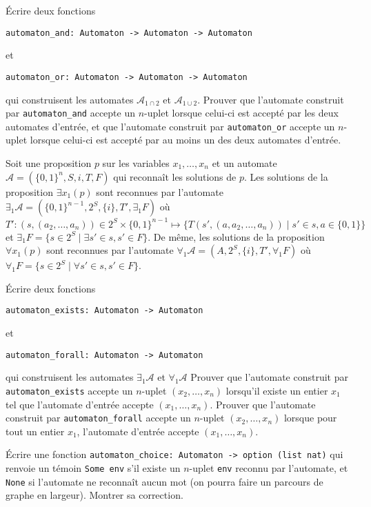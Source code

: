 \documentclass{article}
\begin{document}
Écrire deux fonctions
\begin{verbatim}
automaton_and: Automaton -> Automaton -> Automaton
\end{verbatim}
et
\begin{verbatim}
automaton_or: Automaton -> Automaton -> Automaton
\end{verbatim}
qui construisent les automates \(\mathcal A_{1 \cap 2}\) et \(\mathcal A_{1 \cup 2}\). Prouver que l'automate construit par \texttt{automaton_and} accepte un \(n\)-uplet lorsque celui-ci est accepté par les deux automates d'entrée, et que l'automate construit par \texttt{automaton_or}
accepte un \(n\)-uplet lorsque celui-ci est accepté par au moins un des deux automates d'entrée.

Soit une proposition \(p\) sur les variables \(x_1, \dots, x_n\) et un automate \(\mathcal A = (\{0,1\}^n, S, i, T, F)\) qui reconnaît les solutions de \(p\). Les solutions de la proposition \(\exists x_1 (p)\) sont reconnues par l'automate \(\exists_1 \mathcal A = (\{0,1\}^{n-1}, 2^S, \{i\}, T', \exists_1F)\) où \(T' : (s, (a_2, \dots, a_n)) \in 2^S \times \{0,1\}^{n-1} \mapsto \{T(s', (a, a_2, \dots, a_n)) \mid s' \in s, a \in \{0, 1\}\}\)
et \(\exists_1F = \{s \in 2^S \mid \exists s' \in s, s' \in F\}\).
De même, les solutions de la proposition \(\forall x_1 (p)\)
sont reconnues par l'automate \(\forall_1 \mathcal A = (A, 2^S, \{i\}, T', \forall_1F)\)
où \(\forall_1F = \{s \in 2^S \mid \forall s' \in s, s' \in F\}\).

Écrire deux fonctions
\begin{verbatim}
automaton_exists: Automaton -> Automaton
\end{verbatim}
et
\begin{verbatim}
automaton_forall: Automaton -> Automaton
\end{verbatim}
qui construisent les automates \(\exists_1 \mathcal A\) et \(\forall_1 \mathcal A\)
Prouver que l'automate construit par \texttt{automaton_exists} accepte un \(n\)-uplet \((x_2, \dots, x_n)\)
lorsqu'il existe un entier \(x_1\) tel que l'automate d'entrée accepte \((x_1, \dots, x_n)\).
Prouver que l'automate construit par \texttt{automaton_forall} accepte un \(n\)-uplet \((x_2, \dots, x_n)\)
lorsque pour tout un entier \(x_1\), l'automate d'entrée accepte \((x_1, \dots, x_n)\).

Écrire une fonction \texttt{automaton_choice: Automaton -> option (list nat)} qui renvoie un témoin \texttt{Some env} s'il existe un \(n\)-uplet \texttt{env} reconnu par l'automate, et \texttt{None} si l'automate ne reconnaît aucun mot (on pourra faire un parcours de graphe en largeur). Montrer sa correction.
\end{document}
